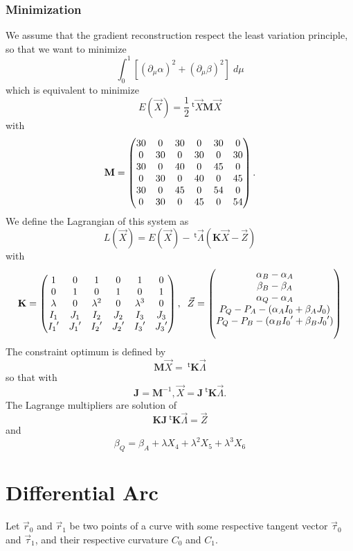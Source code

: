 \documentclass[11pt]{amsart}
\newcommand{\mymat}[1]{\mathbf{#1}}
\newcommand{\mytrn}[1]{{\!\!~^{\mathsf{t}}{#1}}}
\begin{document}
\subsubsection{Minimization}
We assume that the gradient reconstruction respect the least variation principle,
so that we want to minimize
\[
	\int_0^1 \left[ \left(\partial_\mu\alpha\right)^2 + \left(\partial_\mu\beta\right)^2\right] \; d\mu
\]
which is equivalent to minimize
\[
	E(\vec{X}) = \frac{1}{2} \mytrn{\vec{X}} \mymat{M} \vec{X}
\]
with
\[\mymat{M}=\begin{pmatrix}30 & 0 & 30 & 0 & 30 & 0\cr 0 & 30 & 0 & 30 & 0 & 30\cr 30 & 0 & 40 & 0 & 45 & 0\cr 0 & 30 & 0 & 40 & 0 & 45\cr 30 & 0 & 45 & 0 & 54 & 0\cr 0 & 30 & 0 & 45 & 0 & 54\end{pmatrix}.
\]
We define the Lagrangian of this system as
\[
	L(\vec{X}) = E(\vec{X}) - \mytrn{\vec{\Lambda}} \left( \mymat{K}\vec{X} - \vec{Z}\right)
\]
with
\[
	\mymat{K} =
	\begin{pmatrix}
	1 & 0 & 1 & 0 & 1 & 0\cr
	0 & 1 & 0 & 1 & 0 & 1\cr
	\lambda & 0 & \lambda^2 & 0 & \lambda^3 & 0\cr
	I_1 & J_1 & I_2 & J_2 & I_3 & J_3\cr
	{I_1}' & {J_1}' & {I_2}' & {J_2}' & {I_3}' & {J_3}'\cr
	\end{pmatrix},\;\;
	\vec{Z} =
	\begin{pmatrix}
	\alpha_B - \alpha_A \cr
	\beta_B  - \beta_A  \cr
	\alpha_Q - \alpha_A \cr
	P_Q-P_A -( \alpha_A  I_0    + \beta_A J_0)\cr
	P_Q-P_B -( \alpha_B {I_0}'  + \beta_B {J_0}')\cr \cr
	\end{pmatrix}
\]
The constraint optimum is defined by
\[
	\mymat{M}\vec{X} = \mytrn{\mymat{K}} \vec{\Lambda}
\]
so that with
\[
	\mymat{J} = \mymat{M}^{-1}, \vec{X} = \mymat{J}\mytrn{\mymat{K}} \vec{\Lambda}.
\]
The Lagrange multipliers are solution of
\[
	 \mymat{K}\mymat{J}\mytrn{\mymat{K}}\vec{\Lambda} = \vec{Z}
\]
and
\[
	\beta_Q = \beta_A + \lambda X_4 + \lambda^2 X_5 + \lambda^3 X_6
\]

\section{Differential Arc}
Let $\vec{r}_0$ and $\vec{r}_1$ be two points of a curve
with some respective tangent vector $\vec{\tau}_0$ and $\vec{\tau}_1$, and their
respective curvature $C_0$ and $C_1$.
\end{document}
